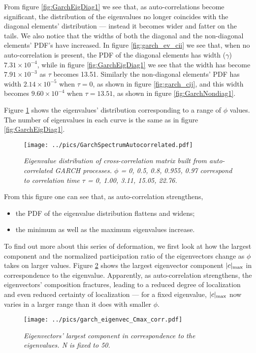 \documentclass{report}
\begin{document}
From figure \ref{fig:GarchEigDiag1} we see that, as auto-correlations
become significant, the distribution of the eigenvalues no longer
coincides with the diagonal elements' distribution --- instead it
becomes wider and fatter on the tails. We also notice that the widths
of both the diagonal and the non-diagonal elements' PDF's have
increased.  In figure \ref{fig:garch_ev_cii} we see that, when no
auto-correlation is present, the PDF of the diagonal elements has
width ($\gamma$) $7.31 \times 10^{-4}$, while in figure
\ref{fig:GarchEigDiag1} we see that the width has become $7.91 \times
10^{-3}$ as $\tau$ becomes 13.51. Similarly the non-diagonal elements'
PDF has width $2.14 \times 10^{-5}$ when $\tau=0$, as shown in figure
\ref{fig:garch_cij}, and this width becomes $9.60 \times 10^{-4}$ when
$\tau = 13.51$, as shown in figure \ref{fig:GarchNondiag1}.

Figure \ref{fig:GarchSpectrumAutocorrelated} shows the eigenvalues'
distribution corresponding to a range of $\phi$ values. The number of
eigenvalues in each curve is the same as in figure
\ref{fig:GarchEigDiag1}.
\begin{figure}[htb!]
  \centering
  \texttt{[image: ../pics/GarchSpectrumAutocorrelated.pdf]}
  \caption{\small \it Eigenvalue distribution of cross-correlation
    matrix built from auto-correlated GARCH processes. $\phi$ = 0,
    0.5, 0.8, 0.955, 0.97 correspond to correlation time $\tau$ =
    0, 1.00, 3.11, 15.05, 22.76.}
  \label{fig:GarchSpectrumAutocorrelated}
\end{figure}
From this figure one can see that, as auto-correlation strengthens,
\begin{itemize}
\item the PDF of the eigenvalue distribution flattens and widens;
\item the minimum as well as the maximum eigenvalues increase.
\end{itemize}

To find out more about this series of deformation, we first look at
how the largest component and the normalized participation ratio of
the eigenvectors change as $\phi$ takes on larger values. Figure
\ref{fig:garch_eigenvec_Cmax_corr} shows the largest eigenvector
component $|c|_{\text{max}}$ in correspondence to the eigenvalue. Apparently, as
auto-correlation strengthens, the eigenvectors' composition
fractures, leading to a reduced degree of localization and even
reduced certainty of localization --- for a fixed eigenvalue, $|c|_{\text{max}}$
now varies in a larger range than it does with smaller $\phi$.
\begin{figure}[htb!]
  \centering
  \texttt{[image: ../pics/garch\_eigenvec\_Cmax\_corr.pdf]}
  \caption{\small \it Eigenvectors' largest component in
    correspondence to the eigenvalues. N is fixed to 50.}
  \label{fig:garch_eigenvec_Cmax_corr}
\end{figure}
\end{document}
